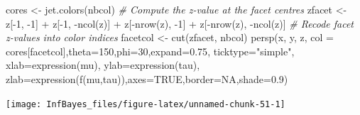 \documentclass[
]{book}
\newenvironment{Shaded}{\begin{snugshade}}{\end{snugshade}}
\newcommand{\AttributeTok}[1]{\textcolor[rgb]{0.77,0.63,0.00}{#1}}
\newcommand{\CommentTok}[1]{\textcolor[rgb]{0.56,0.35,0.01}{\textit{#1}}}
\newcommand{\ConstantTok}[1]{\textcolor[rgb]{0.00,0.00,0.00}{#1}}
\newcommand{\DecValTok}[1]{\textcolor[rgb]{0.00,0.00,0.81}{#1}}
\newcommand{\FloatTok}[1]{\textcolor[rgb]{0.00,0.00,0.81}{#1}}
\newcommand{\FunctionTok}[1]{\textcolor[rgb]{0.00,0.00,0.00}{#1}}
\newcommand{\NormalTok}[1]{#1}
\newcommand{\OtherTok}[1]{\textcolor[rgb]{0.56,0.35,0.01}{#1}}
\newcommand{\SpecialCharTok}[1]{\textcolor[rgb]{0.00,0.00,0.00}{#1}}
\newcommand{\StringTok}[1]{\textcolor[rgb]{0.31,0.60,0.02}{#1}}
\begin{document}
\begin{Shaded}
\begin{Highlighting}[]
\NormalTok{cores }\OtherTok{\textless{}{-}} \FunctionTok{jet.colors}\NormalTok{(nbcol)}
\CommentTok{\# Compute the z{-}value at the facet centres}
\NormalTok{zfacet }\OtherTok{\textless{}{-}}\NormalTok{ z[}\SpecialCharTok{{-}}\DecValTok{1}\NormalTok{, }\SpecialCharTok{{-}}\DecValTok{1}\NormalTok{] }\SpecialCharTok{+}\NormalTok{ z[}\SpecialCharTok{{-}}\DecValTok{1}\NormalTok{, }\SpecialCharTok{{-}}\FunctionTok{ncol}\NormalTok{(z)] }\SpecialCharTok{+} 
\NormalTok{          z[}\SpecialCharTok{{-}}\FunctionTok{nrow}\NormalTok{(z), }\SpecialCharTok{{-}}\DecValTok{1}\NormalTok{] }\SpecialCharTok{+}\NormalTok{ z[}\SpecialCharTok{{-}}\FunctionTok{nrow}\NormalTok{(z), }\SpecialCharTok{{-}}\FunctionTok{ncol}\NormalTok{(z)]}
\CommentTok{\# Recode facet z{-}values into color indices}
\NormalTok{facetcol }\OtherTok{\textless{}{-}} \FunctionTok{cut}\NormalTok{(zfacet, nbcol)}
\FunctionTok{persp}\NormalTok{(x, y, z, }\AttributeTok{col =}\NormalTok{ cores[facetcol],}\AttributeTok{theta=}\DecValTok{150}\NormalTok{,}\AttributeTok{phi=}\DecValTok{30}\NormalTok{,}\AttributeTok{expand=}\FloatTok{0.75}\NormalTok{,}
      \AttributeTok{ticktype=}\StringTok{"simple"}\NormalTok{, }\AttributeTok{xlab=}\FunctionTok{expression}\NormalTok{(mu), }\AttributeTok{ylab=}\FunctionTok{expression}\NormalTok{(tau),}
      \AttributeTok{zlab=}\FunctionTok{expression}\NormalTok{(}\FunctionTok{f}\NormalTok{(mu,tau)),}\AttributeTok{axes=}\ConstantTok{TRUE}\NormalTok{,}\AttributeTok{border=}\ConstantTok{NA}\NormalTok{,}\AttributeTok{shade=}\FloatTok{0.9}\NormalTok{)}
\end{Highlighting}
\end{Shaded}

\begin{center}\texttt{[image: InfBayes\_files/figure-latex/unnamed-chunk-51-1]} \end{center}
\end{document}
